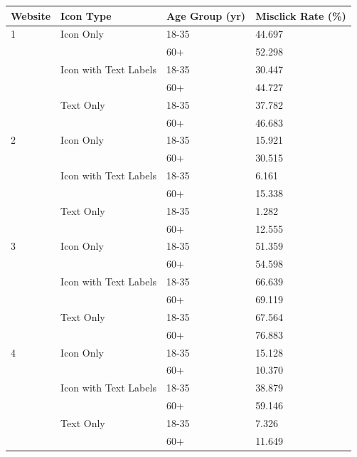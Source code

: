\documentclass[12pt,twoside]{reedthesis}
\begin{document}
\begin{table}[h!]
    \centering
    \begin{tabular}{| p{2cm} | p{5cm} | p{3cm} | p{3.5cm}|}
        \hline
        Website & Icon Type & Age Group (yr) & Misclick Rate (\%)\\
        \hline
        1 & Icon Only & 18-35 & 44.697\\
        \hline
        & & 60+ & 52.298\\
        \hline
        & Icon with Text Labels & 18-35 & 30.447\\
        \hline
        && 60+ & 44.727\\
        \hline
        & Text Only & 18-35 & 37.782\\
        \hline
         && 60+ & 46.683\\
        \hline

        2 & Icon Only & 18-35 & 15.921\\
        \hline
        & & 60+ & 30.515\\
        \hline
        & Icon with Text Labels & 18-35 & 6.161\\
        \hline
        && 60+ & 15.338\\
        \hline
        & Text Only & 18-35 & 1.282\\
        \hline
         && 60+ & 12.555\\
        \hline

        3 & Icon Only & 18-35 & 51.359\\
        \hline
        & & 60+ & 54.598\\
        \hline
        & Icon with Text Labels & 18-35 & 66.639\\
        \hline
        && 60+ & 69.119\\
        \hline
        & Text Only & 18-35 & 67.564\\
        \hline
         && 60+ & 76.883\\
        \hline

        4 & Icon Only & 18-35 & 15.128\\
        \hline
        & & 60+ & 10.370\\
        \hline
        & Icon with Text Labels & 18-35 & 38.879\\
        \hline
        && 60+ & 59.146\\
        \hline
        & Text Only & 18-35 & 7.326\\
        \hline
         && 60+ & 11.649\\
        \hline


\end{tabular}
\end{table}
\end{document}
